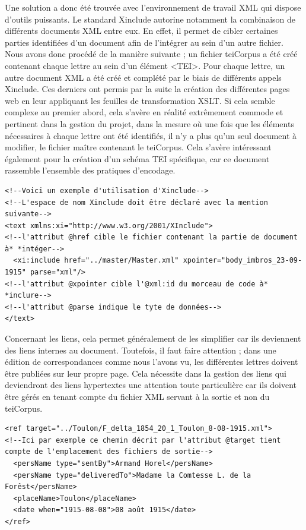 \documentclass[12pt,a4paper]{book} %
\begin{document}
Une solution a donc été trouvée avec l'environnement de travail XML qui dispose d'outils puissants. Le standard Xinclude autorine notamment la combinaison de différents documents XML entre eux. En effet, il permet de cibler certaines parties identifiées d'un document afin de l'intégrer au sein d'un autre fichier. Nous avons donc procédé de la manière suivante ; un fichier teiCorpus a été créé contenant chaque lettre au sein d'un élément <TEI>. Pour chaque lettre, un autre document XML a été créé et complété par le biais de différents appels Xinclude. Ces derniers ont permis par la suite la création des différentes pages web en leur appliquant les feuilles de transformation XSLT. Si cela semble complexe au premier abord, cela s'avère en réalité extrêmement commode et pertinent dans la gestion du projet, dans la mesure où une fois que les éléments nécessaires à chaque lettre ont été identifiés, il n'y a plus qu'un seul document à modifier, le fichier maître contenant le teiCorpus. Cela s'avère intéressant également pour la création d'un schéma TEI spécifique, car ce document rassemble l'ensemble des pratiques d'encodage.
\bigskip

\begin{lstlisting}
<!--Voici un exemple d'utilisation d'Xinclude-->
<!--L'espace de nom Xinclude doit être déclaré avec la mention suivante-->
<text xmlns:xi="http://www.w3.org/2001/XInclude">
<!--l'attribut @href cible le fichier contenant la partie de document à* *intéger-->
  <xi:include href="../master/Master.xml" xpointer="body_imbros_23-09-1915" parse="xml"/>
<!--l'attribut @xpointer cible l'@xml:id du morceau de code à* *inclure-->
<!--l'attribut @parse indique le tyte de données-->  
</text>
\end{lstlisting}
\bigskip

Concernant les liens, cela permet généralement de les simplifier car ils deviennent des liens internes au document. Toutefois, il faut faire attention ; dans une édition de correspondances comme nous l'avons vu, les différentes lettres doivent être publiées sur leur propre page. Cela nécessite dans la gestion des liens qui deviendront des liens hypertextes une attention toute particulière car ils doivent être gérés en tenant compte du fichier XML servant à la sortie et non du teiCorpus.
\bigskip

\begin{lstlisting}
<ref target="../Toulon/F_delta_1854_20_1_Toulon_8-08-1915.xml">
<!--Ici par exemple ce chemin décrit par l'attribut @target tient compte de l'emplacement des fichiers de sortie-->
  <persName type="sentBy">Armand Horel</persName>
  <persName type="deliveredTo">Madame la Comtesse L. de la Forêst</persName>
  <placeName>Toulon</placeName>
  <date when="1915-08-08">08 août 1915</date>
</ref>
\end{lstlisting}
\bigskip
\end{document}
